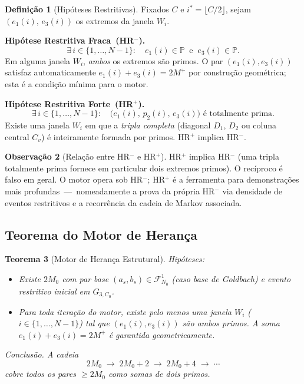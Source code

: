 \documentclass[12pt, a4paper]{article}
\theoremstyle{plain}
\newtheorem{theorem}{Teorema}[section]
\theoremstyle{definition}
\newtheorem{definition}[theorem]{Definição}
\newtheorem{remark}[theorem]{Observação}
\theoremstyle{remark}
\begin{document}
	\begin{definition}[Hipóteses Restritivas]
		\label{def:HR}
		Fixados $C$ e $i^*=\lfloor C/2\rfloor$, sejam
		$(e_1(i),\,e_3(i))$ os extremos da janela $W_i$.
		
		\medskip
		\textbf{Hipótese Restritiva Fraca~(HR$^-$).}
		\[
		\exists\, i\in\{1,\ldots,N-1\}:
		\quad e_1(i)\in\mathbb{P}
		\;\;\text{e}\;\;
		e_3(i)\in\mathbb{P}.
		\]
		Em alguma janela $W_i$, \emph{ambos} os extremos são primos.
		O par $(e_1(i),e_3(i))$ satisfaz automaticamente
		$e_1(i)+e_3(i)=2M^+$ por construção geométrica; esta é a
		condição mínima para o motor.
		
		\medskip
		\textbf{Hipótese Restritiva Forte~(HR$^+$).}
		\[
		\exists\, i\in\{1,\ldots,N-1\}:
		\quad \bigl(e_1(i),\,p_2(i),\,e_3(i)\bigr)
		\text{ é totalmente prima.}
		\]
		Existe uma janela $W_i$ em que a \emph{tripla completa}
		(diagonal $D_1$, $D_2$ ou coluna central $C_v$) é inteiramente
		formada por primos.  HR$^+$ implica HR$^-$.
	\end{definition}
	
	\begin{remark}[Relação entre HR$^-$ e HR$^+$]
		HR$^+$ implica HR$^-$ (uma tripla totalmente prima fornece em
		particular dois extremos primos).  O recíproco é falso em geral.
		O motor opera sob HR$^-$; HR$^+$ é a ferramenta para
		demonstrações mais profundas~---~nomeadamente a prova da própria
		HR$^-$ via densidade de eventos restritivos e a recorrência da
		cadeia de Markov associada.
	\end{remark}
	
	\subsection{Teorema do Motor de Herança}
	
	\begin{theorem}[Motor de Herança Estrutural]
		\label{thm:motor}
		\textit{Hipóteses:}
		\begin{itemize}
			\item[\textbf{(HI)}] Existe $2M_0$ com par base
			$(a_s,b_s)\in\mathcal{F}_{N_0}^1$ (caso base de Goldbach)
			e evento restritivo inicial em $G_{3,C_0}$.
			\item[\textbf{(HR$^-$)}] Para toda iteração do motor, existe
			pelo menos uma janela $W_i$ ($i\in\{1,\ldots,N-1\}$) tal que
			$(e_1(i),e_3(i))$ são ambos primos.
			A soma $e_1(i)+e_3(i)=2M^+$ é garantida geometricamente.
		\end{itemize}
		
		\textit{Conclusão.}  A cadeia
		\[
		2M_0 \;\longrightarrow\; 2M_0+2 \;\longrightarrow\; 2M_0+4
		\;\longrightarrow\; \cdots
		\]
		cobre todos os pares $\geq 2M_0$ como somas de dois primos.
	\end{theorem}
	
\end{document}
